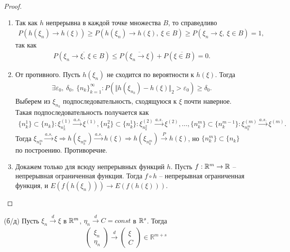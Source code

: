\begin{proof} ~
	\begin{enumerate}
		\item Так как $h$ непрерывна в каждой точке множества $B$, то справедливо 
		\begin{gather*}
		    P\left(h\left(\xi_n\right) \rightarrow h\left(\xi\right)\right) \ge P\left(h\left(\xi_n\right) \rightarrow h\left(\xi\right),\ \xi \in B\right) \ge P\left(\xi_n \rightarrow \xi,\ \xi \in B\right) = 1,
		\end{gather*}
		так как
		\begin{gather*}
		    P\left(\overline{\xi_n \rightarrow \xi,\ \xi \in B}\right) \le P\left(\overline{\xi_n \rightarrow \xi}\right) + P\left(\overline{\xi \in B}\right) = 0.
		\end{gather*}
		
		\item От противного. Пусть $h\left(\xi_n\right)$ не сходится по вероятности к $h\left(\xi\right)$. Тогда
		\begin{gather*}
		    \exists \varepsilon_0,\ \delta_0,\ \{n_k\}_{k=1}^\infty : P(\Vert h(\xi_{n_k}) - h(\xi)\Vert_2 > \varepsilon_0) \ge \delta_0.
		\end{gather*}
		Выберем из $\xi_{n_k}$ подпоследовательность, сходящуюся к $\xi$ почти наверное. Такая подпоследовательность получается как
		\begin{gather*}
		    \{n_k^1\} \subset \{n_k\}: \xi^{(1)}_{n_k^1} \xrightarrow{a.s.} \xi^{(1)}, \{n_k^2\} \subset \{n_k^1\}: \xi^{(2)}_{n_k^2}\xrightarrow{a.s.} \xi^{(2)},\ldots, \{n_k^m\} \subset \{n_k^{m-1}\}: \xi^{(m)}_{n_k^m}\xrightarrow{a.s.} \xi^{(m)}.
		\end{gather*}
		Тогда $\xi_{n_k^m} \xrightarrow{a.s.} \xi \Rightarrow h(\xi_{n_k^m}) \xrightarrow{a.s.} h(\xi) \Rightarrow h(\xi_{n_k^m}) \xrightarrow{P} h(\xi)$, но $\{n_k^m\} \subset \{n_k\}$ по построению. Противоречие.
		
		\item Докажем только для всюду непрерывных функций $h$. Пусть $f:\mathbb{R}^m\rightarrow\mathbb{R}$ -- непрерывная ограниченная функция. Тогда $f \circ h$ -- непрерывная ограниченная функция, и $E\left(f\left(h\left(\xi_n\right)\right)\right) \rightarrow E\left(f \left( h\left( \xi\right) \right) \right).$
	\end{enumerate}
\end{proof}

\begin{proposition}
	(б/д) Пусть $\xi_n \xrightarrow{d} \xi$ в $\mathbb{R}^m$, $\eta_n \xrightarrow{d} C = const$ в $\mathbb{R}^s$. Тогда
	\begin{gather*}
	    \begin{pmatrix}
		\xi _{n}\\
		\eta _{n}
    	\end{pmatrix}\xrightarrow{d}
    	\begin{pmatrix}
    		\xi \\
    		C
    	\end{pmatrix} \in \mathbb{R}^{m+s}
	\end{gather*}
\end{proposition}


